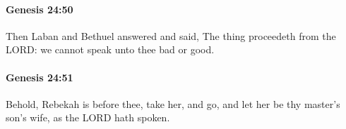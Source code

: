 		\paragraph{Genesis 24:50} %
			\label{GENESIS-24-50}

			Then Laban and Bethuel answered and said, The thing proceedeth from the LORD: we cannot speak unto thee bad or good.


		\paragraph{Genesis 24:51} %
			\label{GENESIS-24-51}

			Behold, Rebekah is before thee, take her, and go, and let her be thy master's son's wife, as the LORD hath spoken.


